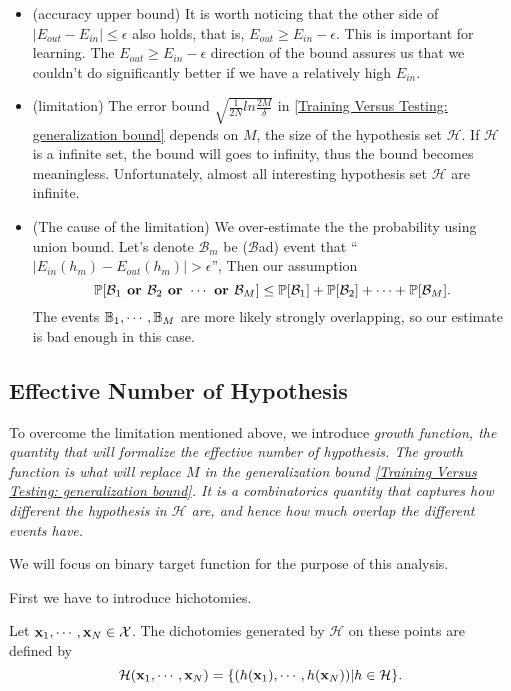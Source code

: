 \begin{itemize}[noitemsep, topsep=0pt]
    \item (accuracy upper bound) It is worth noticing that the other side of $|E_{out} - E_{in}| \le \epsilon$ also holds,
        that is, $E_{out} \ge E_{in} - \epsilon$.
        This is important for learning. 
        The $E_{out} \ge E_{in} - \epsilon$ direction of the bound assures us that we couldn't do significantly better
        if we have a relatively high $E_{in}$.
    \item (limitation) The error bound $\sqrt{\frac{1}{2N} ln \frac{2M}{\delta}}$ in \ref{Training Versus Testing: generalization bound}
        depends on $M$, the size of the hypothesis set $\mathcal{H}$. 
        If $\mathcal{H}$ is a infinite set,
        the bound will goes to infinity,
        thus the bound becomes meaningless.
        Unfortunately, almost all interesting hypothesis set $\mathcal{H}$ are infinite.
    \item (The cause of the limitation) We over-estimate the the probability using union bound. 
        Let's denote $\mathcal{B}_m$ be ($\mathcal{B}$ad) event that ``$|E_{in}(h_m) - E_{out}(h_m)| > \epsilon$'',
        Then our assumption
        \begin{equation}
            \bb{P}[\mathcal{B}_1 \bf{ or } \mathcal{B}_2 \bf{ or } \cdots \bf{ or }\mathcal{B}_M]
            \le \bb{P}[\mathcal{B}_1] + \bb{P}[\mathcal{B}_2] + \cdots + \bb{P}[\mathcal{B}_M].
        \end{equation}
        The events $\bb{B}_1, \cdots, \bb{B}_M$ are more likely strongly overlapping,
        so our estimate is bad enough in this case.
\end{itemize}

\subsection{Effective Number of Hypothesis}
To overcome the limitation mentioned above, we introduce \it{growth function},
the quantity that will formalize the effective number of hypothesis.
The growth function is what will replace $M$ in the generalization bound \ref{Training Versus Testing: generalization bound}.
It is a combinatorics quantity that captures how different the hypothesis in $\mathcal{H}$ are,
and hence how much overlap the different events have.\par
We will focus on binary target function for the purpose of this analysis.\par

First we have to introduce hichotomies.
\begin{mydef}
    Let $\bf{x}_1, \cdots, \bf{x}_N \in \mathcal{X}$. The dichotomies generated by $\mathcal{H}$ on these points are defined by
    \begin{equation}
        \mathcal{H}(\bf{x}_1, \cdots, \bf{x}_N) = \{ (h(\bf{x}_1), \cdots, h(\bf{x}_N)) | h \in \mathcal{H} \}.
    \end{equation}
\end{mydef}

